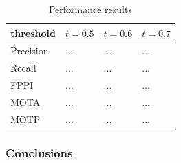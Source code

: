 \begin{table}[h]
	\caption{Performance results}
	\begin{tabularx}{\columnwidth}{XXXX}
		\toprule
		\textbf{threshold} & $t=0.5$ & $t=0.6$ & $t=0.7$ \\
		\toprule
		Precision & ... & ... & ... \\
		\midrule
		Recall & ... & ... & ... \\
		\midrule		
		FPPI & ... & ... & ... \\
		\midrule
		MOTA & ... & ... & ... \\
		\midrule
		MOTP & ... & ... & ... \\
		\bottomrule
	\end{tabularx}
	\label{tab:res}
\end{table}

\subsubsection{Conclusions}

